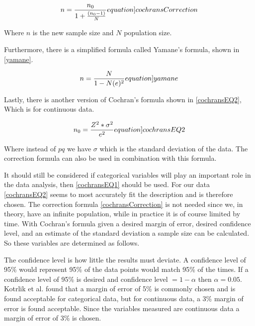 \begin{equation}
    n = \frac{n_0}{1+\frac{(n_0-1)}{N}}
    \label[equation]{cochransCorrection}
\end{equation}

Where $n$ is the new sample size and $N$ population size.



Furthermore, there is a simplified formula called Yamane's formula, shown in \cref{yamane}\cite{israel1992determining}. 

\begin{equation}
    n = \frac{N}{1 - N(e)^2}
    \label[equation]{yamane}
\end{equation}


Lastly, there is another version of Cochran's formula shown in \cref{cochransEQ2}, Which is for continuous data. 

\begin{equation}
    n_0 = \frac{Z^2*\sigma^2}{e^2}
    \label[equation]{cochransEQ2}
\end{equation}

Where instead of $pq$ we have $\sigma$ which is the standard deviation of the data. The correction formula can also be used in combination with this formula.\nytafsnit



It should still be considered if categorical variables will play an important role in the data analysis, then \cref{cochransEQ1} should be used\cite{kotrlik2001organizational}. For our data \cref{cochransEQ2} seems to most accurately fit the description and is therefore chosen. The correction formula \cref{cochransCorrection} is not needed since we, in theory, have an infinite population, while in practice it is of course limited by time. With Cochran's formula given a desired margin of error, desired confidence level, and an estimate of the standard deviation a sample size can be calculated. So these variables are determined as follows. 

The confidence level is how little the results must deviate. A confidence level of 95\% would represent 95\% of the data points would match 95\% of the times. If a confidence level of 95\% is desired and confidence level $= 1 - \alpha$ then $\alpha = 0.05$. Kotrlik et al.\cite{kotrlik2001organizational} found that a margin of error of 5\% is commonly chosen and is found acceptable for categorical data, but for continuous data, a 3\% margin of error is found acceptable\cite{kotrlik2001organizational}. Since the variables measured are continuous data a margin of error of 3\% is chosen.

